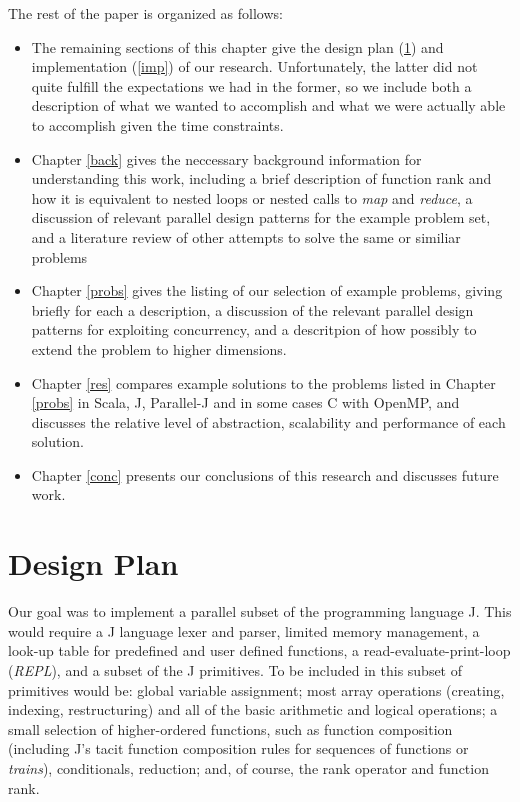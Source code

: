 The rest of the paper is organized as follows:
\begin{itemize}
	\item The remaining sections of this chapter give the design plan (\ref{desp}) and implementation (\ref{imp}) of our research. 
	Unfortunately, the latter did not quite fulfill the expectations we had in the former, so we include both a description of what we wanted to accomplish and what we were actually able to accomplish given the time constraints. 
	\item Chapter \ref{back} gives the neccessary background information for understanding this work, 
	including a brief description of function rank and how it is equivalent to nested loops or nested calls to \textit{map} and \textit{reduce},
	a discussion of relevant parallel design patterns for the example problem set, 
	and a literature review of other attempts to solve the same or similiar problems
    \item Chapter \ref{probs} gives the listing of our selection of example problems, giving briefly for each a description, a discussion of the relevant parallel design patterns for exploiting concurrency, and a descritpion of how possibly to extend the problem to higher dimensions.
    \item Chapter \ref{res} compares example solutions to the problems listed in Chapter \ref{probs} in Scala, J, Parallel-J and in some cases C with OpenMP, and discusses the relative level of abstraction, scalability and performance of each solution. %
    \item Chapter \ref{conc} presents our conclusions of this research and discusses future work.
\end{itemize}

\section{Design Plan}
\label{desp}
Our goal was to implement a parallel subset of the programming language J.
This would require a J language lexer and parser, limited memory management, a look-up table for predefined and user defined functions, a read-evaluate-print-loop (\textit{REPL}), and a subset of the J primitives.
To be included in this subset of primitives would be: global variable assignment; 
most array operations (creating, indexing, restructuring) and all of the basic arithmetic and logical operations; 
a small selection of higher-ordered functions, such as function composition (including J's tacit function composition rules for sequences of functions or \textit{trains}), conditionals, reduction;
and, of course, the rank operator and function rank. %

